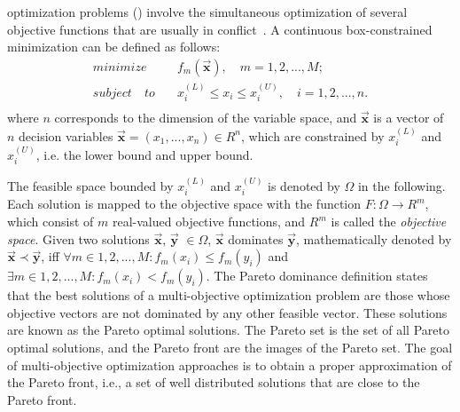  optimization problems (\MOPS{}) %
%
involve the simultaneous optimization of several objective functions that are usually in conflict~\cite{Joel:Kalyanmoy}. 
%
A continuous box-constrained minimization \MOP{} can be defined as follows:
\begin{equation}
   \begin{split}
    minimize \quad & f_m(\vec{\mathbf{x}}), \quad m = 1, 2,...,M;\\
   subject \quad to \quad &  x_i^{(L)} \leq x_i \leq x_i^{(U)}, \quad i=1,2,..., n. \\
   \end{split}
\end{equation}
where $n$ corresponds to the dimension of the variable space, and $\vec{\mathbf{x}}$ is a vector of $n$ decision variables $\vec{\mathbf{x}}=(x_1, ..., x_n) \in R^n$, which are constrained by $x_i^{(L)}$ and $x_i^{(U)}$, i.e. the lower bound and upper bound.

%
The feasible space bounded by $x_i^{(L)}$ and $x_i^{(U)}$ is denoted by $\Omega$ in the following.
%
Each solution is mapped to the objective space with the function $F : \Omega \rightarrow R^m$, which consist of $m$ real-valued objective functions, and $R^m$ is called the \textit{objective space}. 
%
Given two solutions $\vec{\mathbf{x}}$, $\vec{\mathbf{y}}$ $\in \Omega$, $\vec{\mathbf{x}}$ dominates $\vec{\mathbf{y}}$, mathematically denoted by $\vec{\mathbf{x}} \prec \vec{\mathbf{y}}$, iff $\forall m \in {1,2,...,M} : f_m(x_i) \leq f_m(y_i)$ and $\exists  m \in {1,2,...,M} : f_m(x_i) < f_m(y_i)$.
%
%
The Pareto dominance definition states that the best solutions of a multi-objective optimization problem are those whose objective vectors are not dominated by any other feasible vector.
%
These solutions are known as the Pareto optimal solutions.
%
%
The Pareto set is the set of all Pareto optimal solutions, and the Pareto front are the images of the Pareto set. 
%
The goal of multi-objective optimization approaches is to obtain a proper approximation of the Pareto front, i.e., 
a set of well distributed solutions that are close to the Pareto front.
%

